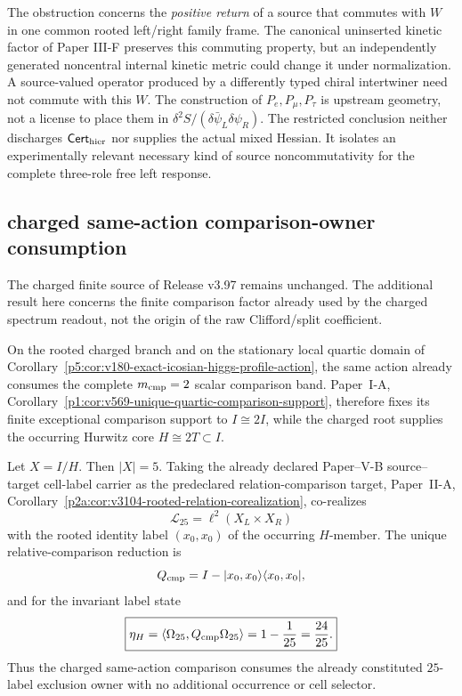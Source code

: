\documentclass[12pt,a4paper]{article}
\begin{document}
\begin{remark}
\label{p5:rem:v3217-hopf-commutant-source-scope}
The obstruction concerns the \emph{positive return} of a source that
commutes with $W$ in one common rooted left/right family frame. The canonical uninserted kinetic factor of Paper III-F preserves this
commuting property, but an independently generated noncentral internal
kinetic metric could change it under normalization. A
source-valued operator produced by a differently typed chiral
intertwiner need not commute with this $W$. The construction of
$P_e,P_\mu,P_\tau$ is upstream geometry, not a license to place them
in $\delta^2S/(\delta\bar\psi_L\delta\psi_R)$.
The restricted conclusion neither discharges
$\mathsf{Cert}_{\rm hier}$ nor supplies the actual mixed Hessian.
It isolates an experimentally relevant necessary kind of source
noncommutativity for the complete three-role free left response.
\end{remark}



\subsection*{charged same-action comparison-owner consumption}
\label{p5:sec:v398-charged-comparison-owner-consumption}
The charged finite source of Release v3.97 remains unchanged.  The additional
result here concerns the finite comparison factor already used by the charged
spectrum readout, not the origin of the raw Clifford/split coefficient.

\begin{theorem}
\label{p5:thm:v398-charged-rooted-comparison-owner-consumption}
On the rooted charged branch and on the stationary local quartic domain of
Corollary~\ref{p5:cor:v180-exact-icosian-higgs-profile-action}, the same action
already consumes the complete $m_{\rm cmp}=2$ scalar comparison band.
Paper~I-A, Corollary~\ref{p1:cor:v569-unique-quartic-comparison-support},
therefore fixes its finite exceptional comparison support to
$I\cong2I$, while the charged root supplies the occurring Hurwitz core
$H\cong2T\subset I$.

Let $X=I/H$.  Then $|X|=5$.  Taking the already declared Paper--V-B
source--target cell-label carrier as the predeclared relation-comparison target,
Paper~II-A, Corollary~\ref{p2a:cor:v3104-rooted-relation-corealization},
co-realizes
\[
 \mathcal L_{25}=\ell^2(X_L\times X_R)
\]
with the rooted identity label $(x_0,x_0)$ of the occurring $H$-member.  The
unique relative-comparison reduction is
\[
 Q_{\rm cmp}=I-|x_0,x_0\rangle\langle x_0,x_0|,
\]
and for the invariant label state
\[
 \boxed{\eta_H
 =\langle\Omega_{25},Q_{\rm cmp}\Omega_{25}\rangle
 =1-\frac1{25}=\frac{24}{25}.}
\]
Thus the charged same-action comparison consumes the already constituted
$25$-label exclusion owner with no additional occurrence or cell selector.
\end{theorem}
\end{document}
